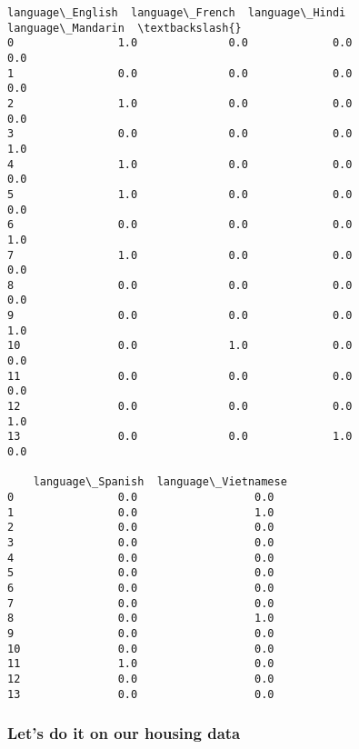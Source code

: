 \documentclass[11pt]{article}
\makeatletter
\newcommand{\boxspacing}{\kern\kvtcb@left@rule\kern\kvtcb@boxsep}
\newcommand{\prompt}[4]{
        {\ttfamily\llap{{\color{#2}[#3]:\hspace{3pt}#4}}\vspace{-\baselineskip}}
    }
\makeatother
\begin{document}
            \begin{tcolorbox}[breakable, size=fbox, boxrule=.5pt, pad at break*=1mm, opacityfill=0]
\prompt{Out}{outcolor}{56}{\boxspacing}
\begin{Verbatim}[commandchars=\\\{\}]
    language\_English  language\_French  language\_Hindi  language\_Mandarin  \textbackslash{}
0                1.0              0.0             0.0                0.0
1                0.0              0.0             0.0                0.0
2                1.0              0.0             0.0                0.0
3                0.0              0.0             0.0                1.0
4                1.0              0.0             0.0                0.0
5                1.0              0.0             0.0                0.0
6                0.0              0.0             0.0                1.0
7                1.0              0.0             0.0                0.0
8                0.0              0.0             0.0                0.0
9                0.0              0.0             0.0                1.0
10               0.0              1.0             0.0                0.0
11               0.0              0.0             0.0                0.0
12               0.0              0.0             0.0                1.0
13               0.0              0.0             1.0                0.0

    language\_Spanish  language\_Vietnamese
0                0.0                  0.0
1                0.0                  1.0
2                0.0                  0.0
3                0.0                  0.0
4                0.0                  0.0
5                0.0                  0.0
6                0.0                  0.0
7                0.0                  0.0
8                0.0                  1.0
9                0.0                  0.0
10               0.0                  0.0
11               1.0                  0.0
12               0.0                  0.0
13               0.0                  0.0
\end{Verbatim}
\end{tcolorbox}
        
    \subsubsection{Let's do it on our housing
data}\label{lets-do-it-on-our-housing-data}
\end{document}
